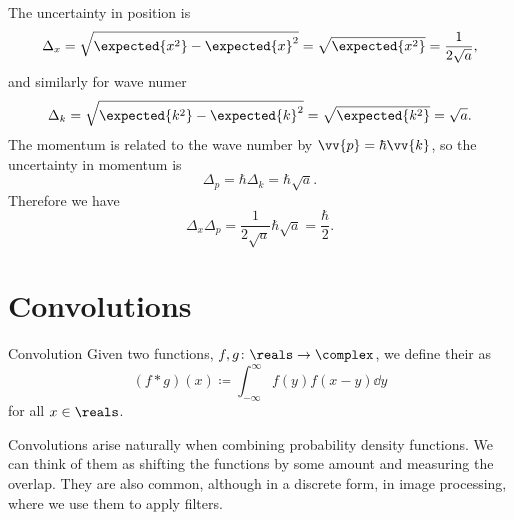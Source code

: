 \documentclass[fleqn]{NotesClass}
\begin{document}
    The uncertainty in position is
    \begin{equation}
        \Delta_x = \sqrt{\expected{x^2} - \expected{x}^2} = \sqrt{\expected{x^2}} = \frac{1}{2\sqrt{a}},
    \end{equation}
    and similarly for wave numer
    \begin{equation}
        \Delta_k = \sqrt{\expected{k^2} - \expected{k}^2} = \sqrt{\expected{k^2}} = \sqrt{a}.
    \end{equation}
    The momentum is related to the wave number by \(\vv{p} = \hbar\vv{k}\), so the uncertainty in momentum is
    \begin{equation}
        \Delta_p = \hbar\Delta_k = \hbar\sqrt{a}.
    \end{equation}
    Therefore we have
    \begin{equation}
        \Delta_x\Delta_p = \frac{1}{2\sqrt{a}} \hbar \sqrt{a} = \frac{\hbar}{2}.
    \end{equation}
    
    \section{Convolutions}
    \begin{dfn}{Convolution}{}
        Given two functions, \(f, g \colon \reals \to \complex\), we define their  as
        \begin{equation}
            (f \ast g)(x) \coloneqq \int_{-\infty}^{\infty} f(y)f(x - y) \dd{y}
        \end{equation}
        for all \(x \in \reals\).
    \end{dfn}
    
    Convolutions arise naturally when combining probability density functions.
    We can think of them as shifting the functions by some amount and measuring the overlap.
    They are also common, although in a discrete form, in image processing, where we use them to apply filters.
    
\end{document}

